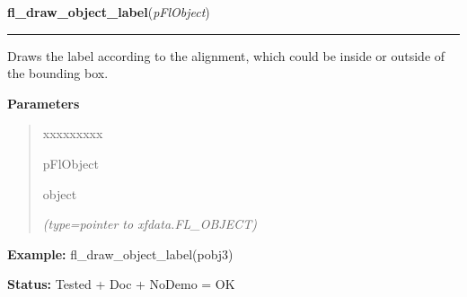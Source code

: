 \hspace{.8\funcindent}\begin{boxedminipage}{\funcwidth}

    \raggedright \textbf{fl\_draw\_object\_label}(\textit{pFlObject})

    \vspace{-1.5ex}

    \rule{\textwidth}{0.5\fboxrule}
\setlength{\parskip}{2ex}
    Draws the label according to the alignment, which could be inside or 
    outside of the bounding box.

\setlength{\parskip}{1ex}
      \textbf{Parameters}
      \vspace{-1ex}

      \begin{quote}
        \begin{Ventry}{xxxxxxxxx}

          \item[pFlObject]

          object

            {\it (type=pointer to xfdata.FL\_OBJECT)}

        \end{Ventry}

      \end{quote}

\textbf{Example:} fl\_draw\_object\_label(pobj3)



\textbf{Status:} Tested + Doc + NoDemo = OK



    \end{boxedminipage}

    \label{xformslib:flbasic:fl_draw_object_label_outside}

    \vspace{0.5ex}

